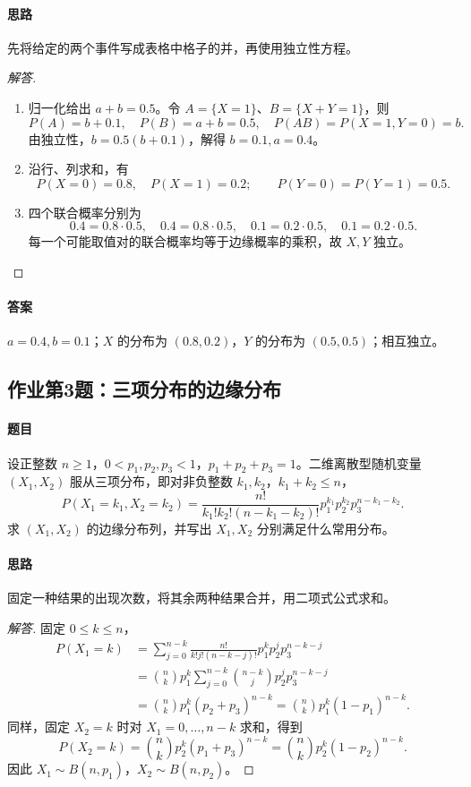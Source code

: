 \paragraph{思路}先将给定的两个事件写成表格中格子的并，再使用独立性方程。
\begin{proof}[解答]
\begin{enumerate}
\item 归一化给出 $a+b=0.5$。令 $A=\{X=1\}$、$B=\{X+Y=1\}$，则
\[
P(A)=b+0.1,\quad P(B)=a+b=0.5,\quad P(AB)=P(X=1,Y=0)=b.
\]
由独立性，$b=0.5(b+0.1)$，解得 $b=0.1,a=0.4$。
\item 沿行、列求和，有
\[
P(X=0)=0.8,\quad P(X=1)=0.2;\qquad
P(Y=0)=P(Y=1)=0.5.
\]
\item 四个联合概率分别为
\[
0.4=0.8\cdot0.5,\quad0.4=0.8\cdot0.5,\quad
0.1=0.2\cdot0.5,\quad0.1=0.2\cdot0.5.
\]
每一个可能取值对的联合概率均等于边缘概率的乘积，故 $X,Y$ 独立。
\end{enumerate}
\end{proof}
\paragraph{答案}$a=0.4,b=0.1$；$X$ 的分布为 $(0.8,0.2)$，$Y$ 的分布为 $(0.5,0.5)$；相互独立。

\subsection{作业第3题：三项分布的边缘分布}\label{ex:w10-h3}
\paragraph{题目}
设正整数 $n\geq1$，$0<p_1,p_2,p_3<1$，$p_1+p_2+p_3=1$。二维离散型随机变量 $(X_1,X_2)$ 服从三项分布，即对非负整数 $k_1,k_2$，$k_1+k_2\leq n$，
\[
P(X_1=k_1,X_2=k_2)=\frac{n!}{k_1!k_2!(n-k_1-k_2)!}
p_1^{k_1}p_2^{k_2}p_3^{n-k_1-k_2}.
\]
求 $(X_1,X_2)$ 的边缘分布列，并写出 $X_1,X_2$ 分别满足什么常用分布。
\paragraph{思路}固定一种结果的出现次数，将其余两种结果合并，用二项式公式求和。
\begin{proof}[解答]
固定 $0\leq k\leq n$，
\begin{align*}
P(X_1=k)
&=\sum_{j=0}^{n-k}\frac{n!}{k!j!(n-k-j)!}p_1^kp_2^jp_3^{n-k-j}\\
&=\binom nkp_1^k\sum_{j=0}^{n-k}\binom{n-k}{j}p_2^jp_3^{n-k-j}\\
&=\binom nkp_1^k(p_2+p_3)^{n-k}
=\binom nkp_1^k(1-p_1)^{n-k}.
\end{align*}
同样，固定 $X_2=k$ 时对 $X_1=0,\ldots,n-k$ 求和，得到
\[
P(X_2=k)=\binom nkp_2^k(p_1+p_3)^{n-k}
=\binom nkp_2^k(1-p_2)^{n-k}.
\]
因此 $X_1\sim B(n,p_1)$，$X_2\sim B(n,p_2)$。
\end{proof}
